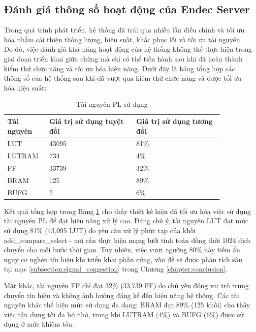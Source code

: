 \documentclass[../DoAn.tex]{subfiles}
\begin{document}
\subsection{Đánh giá thông số hoạt động của Endec Server}

Trong quá trình phát triển, hệ thống đã trải qua nhiều lần điều chỉnh và tối ưu hóa nhằm cải thiện thông lượng, hiệu suất, khắc phục lỗi và tối ưu tài nguyên. Do đó, việc đánh giá khả năng hoạt động của hệ thống không thể thực hiện trong giai đoạn triển khai giữa chừng mà chỉ có thể tiến hành sau khi đã hoàn thành kiểm thử chức năng và tối ưu hóa hiệu năng. Dưới đây là bảng tổng hợp các thông số của hệ thống sau khi đã vượt qua kiểm thử chức năng và được tối ưu hóa hiệu suất: 

\begin{table}[H]
\centering{}
    \caption{Tài nguyên PL sử dụng}
    \begin{tabular}{|p{0.15\linewidth}|p{0.36\linewidth}|p{0.36\linewidth}|}
        \hline
        \textbf{Tài nguyên} & \textbf{Giá trị sử dụng tuyệt đối} & \textbf{Giá trị sử dụng tương đối} \\ \hline\hline
        LUT  & 43095 & 81\% \\ \hline
        LUTRAM  & 734 & 4\% \\ \hline
        FF  & 33739 & 32\% \\ \hline
        BRAM  & 125 & 89\% \\ \hline
        BUFG  & 2 & 6\% \\ \hline
        \end{tabular}
        \label{table:Tài nguyên PL sử dụng}
\end{table}

Kết quả tổng hợp trong Bảng \ref{table:Tài nguyên PL sử dụng} cho thấy thiết kế hiện đã tối ưu hóa việc sử dụng tài nguyên PL để đạt hiệu năng xử lý cao. Đáng chú ý, tài nguyên LUT đạt mức sử dụng 81\% (43,095 LUT) do yêu cầu xử lý phức tạp của khối add\_compare\_select - nơi cần thực hiện mạng lưới tính toán đồng thời 1024 dịch chuyển cho mỗi bước thời gian. Tuy nhiên, việc vượt ngưỡng 80\% này tiềm ẩn nguy cơ nghẽn tín hiệu khi triển khai phần cứng, vấn đề sẽ được phân tích sâu tại mục \ref{subsection:signal_congestion} trong Chương \ref{chapter:conclusion}.

Mặt khác, tài nguyên FF chỉ đạt 32\% (33,739 FF) do chủ yếu đóng vai trò trung chuyển tín hiệu và không ảnh hưởng đáng kể đến hiệu năng hệ thống. Các tài nguyên khác thể hiện mức sử dụng đa dạng: BRAM đạt 89\% (125 khối) cho thấy việc tận dụng tối đa bộ nhớ, trong khi LUTRAM (4\%) và BUFG (6\%) được sử dụng ở mức khiêm tốn. 
\end{document}
